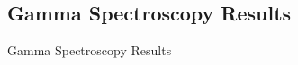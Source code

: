 \documentclass{beamer}
\begin{document}
\subsection{Gamma Spectroscopy Results}
\begin{frame}{Gamma Spectroscopy Results}
\end{frame}
\end{document}
